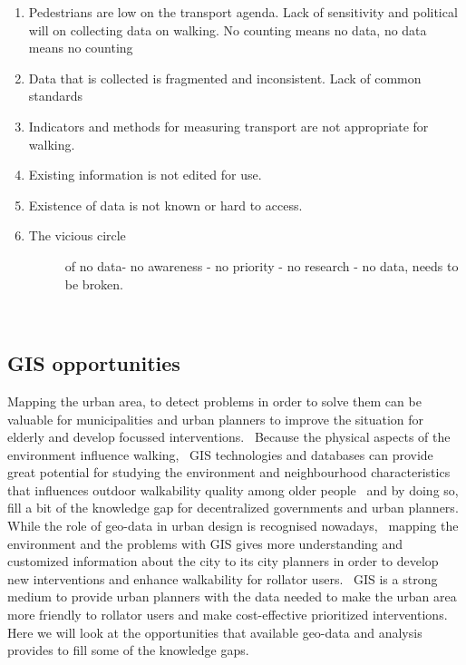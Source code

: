 \flushleft
\begin{enumerate}
\item Pedestrians are low on the transport agenda. Lack of sensitivity and political will on collecting data on walking. No counting means no data, no data means no counting 
\item Data that is collected is fragmented and inconsistent. Lack of common standards 
\item Indicators and methods for measuring transport are not appropriate for walking. 
\item Existing information is not edited for use.
\item Existence of data is not known or hard to access.
\item 
\begin{description}
\item[The vicious circle] of no data- no awareness - no priority - no research - no data, needs to be broken.
\end{description}
\end{enumerate}
~\cite{Sauter2010}


\subsection{GIS opportunities}
Mapping the urban area, to detect problems in order to solve them can be valuable for municipalities and urban planners to improve the situation for elderly and develop focussed interventions.~\cite{Stahl2013} 
Because the physical aspects of the environment influence walking,~\cite{Leslie2005} GIS technologies and databases can provide great potential for studying the environment and neighbourhood characteristics that influences outdoor walkability quality among older people~\cite{Vine2012} and by doing so, fill a bit of the knowledge gap for decentralized governments and urban planners. While the role of geo-data in urban design is recognised nowadays,~\cite{Matthews2003} mapping the environment and the problems with GIS gives more understanding and customized information about the city to its city planners in order to develop new interventions and enhance walkability for rollator users.~\cite{Matthews2003, Svensson2010} GIS is a strong medium to provide urban planners with the data needed to make the urban area more friendly to rollator users and make cost-effective prioritized interventions. 
Here we will look at the opportunities that available geo-data and analysis provides to fill some of the knowledge gaps. 

